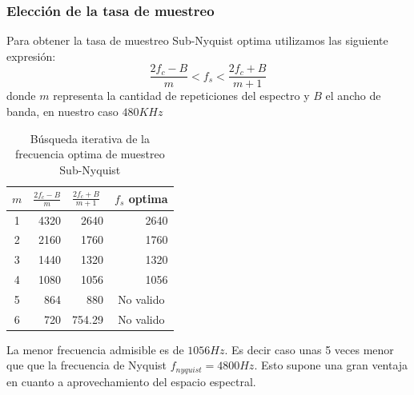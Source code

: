\subsubsection{Elección de la tasa de muestreo}
Para obtener la tasa de muestreo Sub-Nyquist optima utilizamos las siguiente expresión:
\begin{equation}
	\frac{2f_c-B}{m}<f_{s}<\frac{2f_c+B}{m+1}
\end{equation}
donde $m$ representa la cantidad de repeticiones del espectro y $B$ el ancho de banda, en nuestro caso $480KHz$
	\begin{table}[H]
		\centering
		\begin{tabular}{@{}crrr@{}}
			\toprule
			\multicolumn{1}{l}{$m$} & \multicolumn{1}{l}{$\frac{2f_c-B}{m}$} & \multicolumn{1}{l}{$\frac{2f_c+B}{m+1}$} & \multicolumn{1}{l}{$f_s$ optima} \\ \midrule
			1                       & 4320                                   & 2640                                     & 2640                             \\
			2                       & 2160                                   & 1760                                     & 1760                             \\
			3                       & 1440                                   & 1320                                     & 1320                             \\
			4                       & 1080                                   & 1056                                     & 1056                             \\
			5                       & 864                                    & 880                                      & \multicolumn{1}{c}{No valido}    \\
			6                       & 720                                    & 754.29                                   & \multicolumn{1}{c}{No valido}    \\ \bottomrule
		\end{tabular}
	\caption{Búsqueda iterativa de la frecuencia optima de muestreo Sub-Nyquist}
	\end{table}
La menor frecuencia admisible es de $1056Hz$. Es decir caso unas 5 veces menor que que la frecuencia de Nyquist $f_{nyquist}=4800Hz$. Esto supone una gran ventaja en cuanto a aprovechamiento del espacio espectral.

